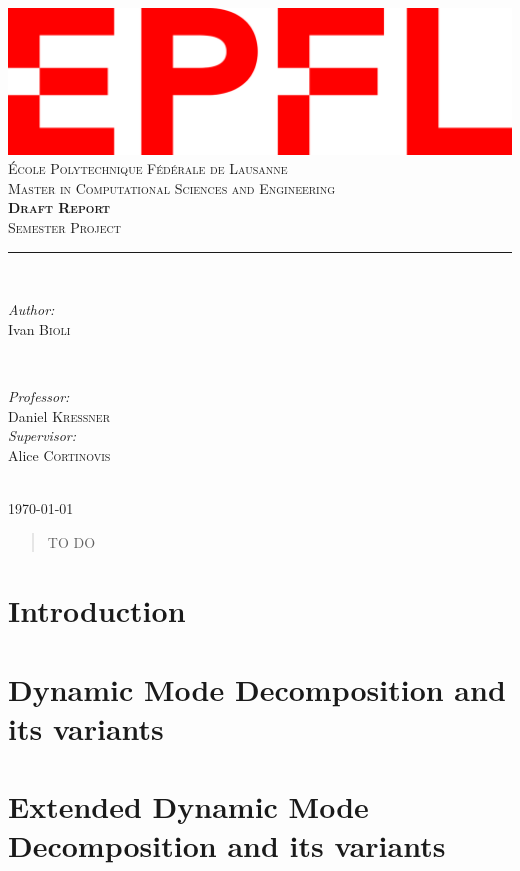 \documentclass[10pt, a4paper]{report}
\begin{document}
\begin{titlepage}
	\centering
    \includegraphics[width=0.4\linewidth]{epfl.png}\\[0.5cm] 	%
    \textsc{\LARGE École Polytechnique Fédérale de Lausanne}\\
    [0.7 cm]
    \textsc{\LARGE Master in Computational Sciences and Engineering}\\
    \vspace{\fill}
    \textbf{\textsc{\fontsize{50}{50}\selectfont Draft Report}}\\ \vspace{\fill}		
	\textsc{\LARGE Semester Project}\\[0.4cm]
	\rule{\linewidth}{0.2 mm} \\[0.5 cm]
	\begin{minipage}{0.4\textwidth}
    \begin{flushleft} \large
    \emph{Author:}\\
    Ivan \textsc{Bioli} %
    \end{flushleft}
    \end{minipage}
    ~
    \begin{minipage}{0.4\textwidth}
    \begin{flushright} \large
    \emph{Professor:} \\
    Daniel \textsc{Kressner} \\
    \emph{Supervisor:} \\
    Alice \textsc{Cortinovis} \\
    \end{flushright}
    \end{minipage}\\
	[2cm] \Large{\today}
	
\end{titlepage}
\restoregeometry

\begin{abstract}
\thispagestyle{empty}
TO DO
\end{abstract}

\clearpage
\thispagestyle{empty}
\tableofcontents

\setcounter{page}{1}

\chapter{Introduction}


\chapter{Dynamic Mode Decomposition and its variants}


\chapter{Extended Dynamic Mode Decomposition and its variants}


\printbibliography
\end{document}
